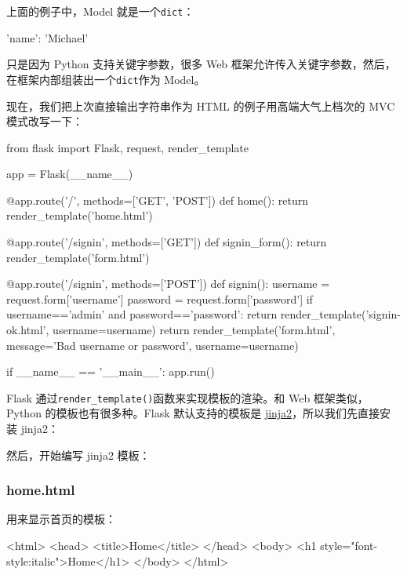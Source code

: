 上面的例子中，Model 就是一个\texttt{dict}：

\begin{pythoncode}
{ 'name': 'Michael' }
\end{pythoncode}

只是因为 Python 支持关键字参数，很多 Web
框架允许传入关键字参数，然后，在框架内部组装出一个\texttt{dict}作为
Model。

现在，我们把上次直接输出字符串作为 HTML 的例子用高端大气上档次的 MVC
模式改写一下：

\begin{pythoncode}
from flask import Flask, request, render_template

app = Flask(__name__)

@app.route('/', methods=['GET', 'POST'])
def home():
    return render_template('home.html')

@app.route('/signin', methods=['GET'])
def signin_form():
    return render_template('form.html')

@app.route('/signin', methods=['POST'])
def signin():
    username = request.form['username']
    password = request.form['password']
    if username=='admin' and password=='password':
        return render_template('signin-ok.html', username=username)
    return render_template('form.html', message='Bad username or password', username=username)

if __name__ == '__main__':
    app.run()
\end{pythoncode}

Flask 通过\texttt{render\_template()}函数来实现模板的渲染。和 Web
框架类似，Python 的模板也有很多种。Flask 默认支持的模板是
\href{http://jinja.pocoo.org/}{jinja2}，所以我们先直接安装 jinja2：


然后，开始编写 jinja2 模板：

\hypertarget{home.html}{%
\subsubsection{home.html}\label{home.html}}

用来显示首页的模板：

\begin{pythoncode}
<html>
<head>
  <title>Home</title>
</head>
<body>
  <h1 style="font-style:italic">Home</h1>
</body>
</html>
\end{pythoncode}

